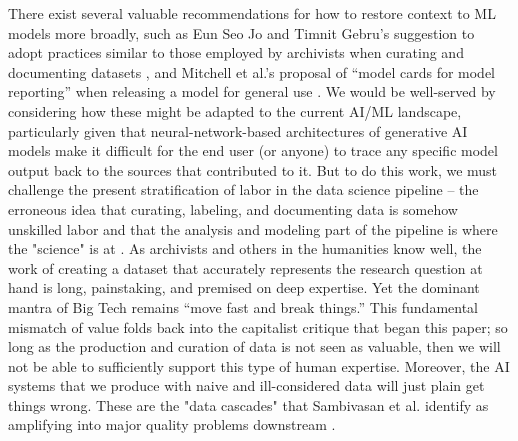 There exist several valuable recommendations for how to restore context to ML models more broadly, such as Eun Seo Jo and Timnit Gebru’s suggestion to adopt practices similar to those employed by archivists when curating and documenting datasets \cite{Jo_Gebru_2020}, and Mitchell et al.’s proposal of “model cards for model reporting” when releasing a model for general use \cite{Mitchell_Wu_Zaldivar_Barnes_Vasserman_Hutchinson_Spitzer_Raji_Gebru_2019}. We would be well-served by considering how these might be adapted to the current AI/ML landscape, particularly given that neural-network-based architectures of generative AI models make it difficult for the end user (or anyone) to trace any specific model output back to the sources that contributed to it. But to do this work, we must challenge the present stratification of labor in the data science pipeline – the erroneous idea that curating, labeling, and documenting data is somehow unskilled labor and that the analysis and modeling part of the pipeline is where the "science" is at \cite{Feinberg_2022}. 
As archivists and others in the humanities know well, the work of creating a dataset that accurately represents the research question at hand is long, painstaking, and premised on deep expertise. Yet the dominant mantra of Big Tech remains “move fast and break things.” This fundamental mismatch of value folds back into the capitalist critique that began this paper; so long as the production and curation of data is not seen as valuable, then we will not be able to sufficiently support this type of human expertise. Moreover, the AI systems that we produce with naive and ill-considered data will just plain get things wrong. These are the "data cascades" that Sambivasan et al. identify as amplifying into major quality problems downstream \cite{Sambasivan_Kapania_Highfill_Akrong_Paritosh_Aroyo_2021}. 


